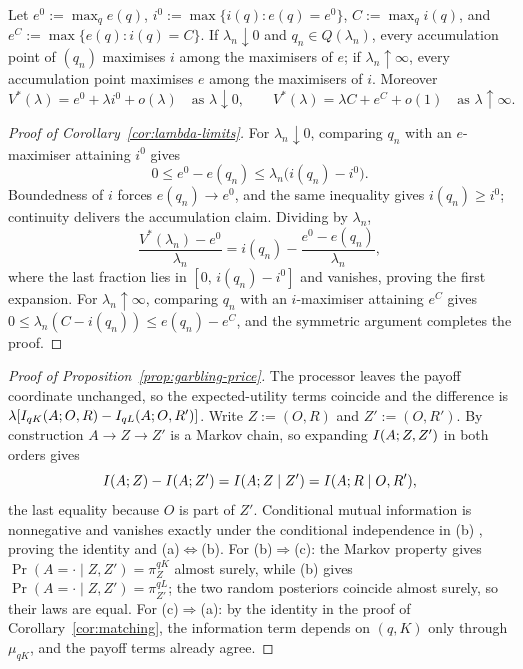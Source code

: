 \begin{corollary}\label{cor:lambda-limits}
Let $e^0:=\max_qe(q)$, $i^0:=\max\{i(q):e(q)=e^0\}$, $C:=\max_qi(q)$, and $e^C:=\max\{e(q):i(q)=C\}$.  If
$\lambda_n\downarrow0$ and $q_n\in Q(\lambda_n)$, every accumulation point of $(q_n)$ maximises $i$ among the
maximisers of $e$; if $\lambda_n\uparrow\infty$, every accumulation point maximises $e$ among the maximisers of
$i$.  Moreover
\[
 V^*(\lambda)=e^0+\lambda i^0+o(\lambda)
 \quad\text{as }\lambda\downarrow0,
 \qquad
 V^*(\lambda)=\lambda C+e^C+o(1)
 \quad\text{as }\lambda\uparrow\infty.
\]
\end{corollary}

\begin{proof}[Proof of Corollary~\ref{cor:lambda-limits}]
For $\lambda_n\downarrow0$, comparing $q_n$ with an $e$-maximiser attaining $i^0$ gives
\[
 0\le e^0-e(q_n)\le\lambda_n\bigl(i(q_n)-i^0\bigr).
\]
Boundedness of $i$ forces $e(q_n)\to e^0$, and the same inequality gives $i(q_n)\ge i^0$; continuity delivers the
accumulation claim.  Dividing by $\lambda_n$,
\[
 \frac{V^*(\lambda_n)-e^0}{\lambda_n}=i(q_n)-\frac{e^0-e(q_n)}{\lambda_n},
\]
where the last fraction lies in $[0,\,i(q_n)-i^0]$ and vanishes, proving the first expansion.  For
$\lambda_n\uparrow\infty$, comparing $q_n$ with an $i$-maximiser attaining $e^C$ gives
$0\le\lambda_n(C-i(q_n))\le e(q_n)-e^C$, and the symmetric argument completes the proof.
\end{proof}

\begin{proof}[Proof of Proposition~\ref{prop:garbling-price}]
The processor leaves the payoff coordinate unchanged, so the expected-utility terms coincide and the difference is
$\lambda[I_{qK}(A;O,R)-I_{qL}(A;O,R')]$.  Write $Z:=(O,R)$ and $Z':=(O,R')$.  By construction $A\to Z\to Z'$ is
a Markov chain, so expanding $I(A;Z,Z')$ in both orders gives
\[
 I(A;Z)-I(A;Z')=I(A;Z\mid Z')=I(A;R\mid O,R'),
\]
the last equality because $O$ is part of $Z'$.  Conditional mutual information is nonnegative and vanishes exactly
under the conditional independence in \textup{(b)} \cite{CoverThomas2006}, proving the identity and
\textup{(a)}$\Leftrightarrow$\textup{(b)}.  For \textup{(b)}$\Rightarrow$\textup{(c)}: the Markov property gives
$\Pr(A=\cdot\mid Z,Z')=\pi^{qK}_{Z}$ almost surely, while \textup{(b)} gives
$\Pr(A=\cdot\mid Z,Z')=\pi^{qL}_{Z'}$; the two random posteriors coincide almost surely, so their laws are equal.
For \textup{(c)}$\Rightarrow$\textup{(a)}: by the identity in the proof of Corollary~\ref{cor:matching}, the
information term depends on $(q,K)$ only through $\mu_{qK}$, and the payoff terms already agree.
\end{proof}

